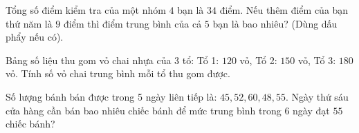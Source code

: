 \begin{ex} %
Tổng số điểm kiểm tra của một nhóm $4$ bạn là $34$ điểm. Nếu thêm điểm của bạn thứ năm là $9$ điểm thì điểm trung bình của cả $5$ bạn là bao nhiêu? (Dùng dấu phẩy nếu có).
\end{ex}

\begin{ex} %
Bảng số liệu thu gom vỏ chai nhựa của $3$ tổ: Tổ 1: $120$ vỏ, Tổ 2: $150$ vỏ, Tổ 3: $180$ vỏ. Tính số vỏ chai trung bình mỗi tổ thu gom được.
\end{ex}

\begin{ex} %
Số lượng bánh bán được trong 5 ngày liên tiếp là: $45, 52, 60, 48, 55$. Ngày thứ sáu cửa hàng cần bán bao nhiêu chiếc bánh để mức trung bình trong 6 ngày đạt $55$ chiếc bánh?
\end{ex}
